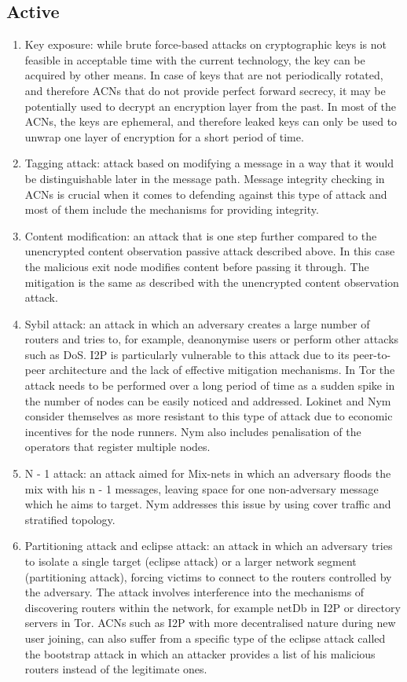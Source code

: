 \subsection{Active}
\begin{enumerate}
    \item Key exposure: while brute force-based attacks on cryptographic keys is not feasible in acceptable time with the current technology, the key can be acquired by other means. In case of keys that are not periodically rotated, and therefore ACNs that do not provide perfect forward secrecy, it may be potentially used to decrypt an encryption layer from the past. In most of the ACNs, the keys are ephemeral, and therefore leaked keys can only be used to unwrap one layer of encryption for a short period of time.
    \item Tagging attack: attack based on modifying a message in a way that it would be distinguishable later in the message path. Message integrity checking in ACNs is crucial when it comes to defending against this type of attack and most of them include the mechanisms for providing integrity.
    \item Content modification: an attack that is one step further compared to the unencrypted content observation passive attack described above. In this case the malicious exit node modifies content before passing it through. The mitigation is the same as described with the unencrypted content observation attack.
    \item Sybil attack: an attack in which an adversary creates a large number of routers and tries to, for example, deanonymise users or perform other attacks such as DoS. I2P is particularly vulnerable to this attack due to its peer-to-peer architecture and the lack of effective mitigation mechanisms. In Tor the attack needs to be performed over a long period of time as a sudden spike in the number of nodes can be easily noticed and addressed. Lokinet and Nym consider themselves as more resistant to this type of attack due to economic incentives for the node runners. Nym also includes penalisation of the operators that register multiple nodes.
    \item N - 1 attack: an attack aimed for Mix-nets in which an adversary floods the mix with his n - 1 messages, leaving space for one non-adversary message which he aims to target. Nym addresses this issue by using cover traffic and stratified topology.
    \item Partitioning attack and eclipse attack: an attack in which an adversary tries to isolate a single target (eclipse attack) or a larger network segment (partitioning attack), forcing victims to connect to the routers controlled by the adversary. The attack involves interference into the mechanisms of discovering routers within the network, for example netDb in I2P or directory servers in Tor. ACNs such as I2P with more decentralised nature during new user joining, can also suffer from a specific type of the eclipse attack called the bootstrap attack in which an attacker provides a list of his malicious routers instead of the legitimate ones.

\end{enumerate}
